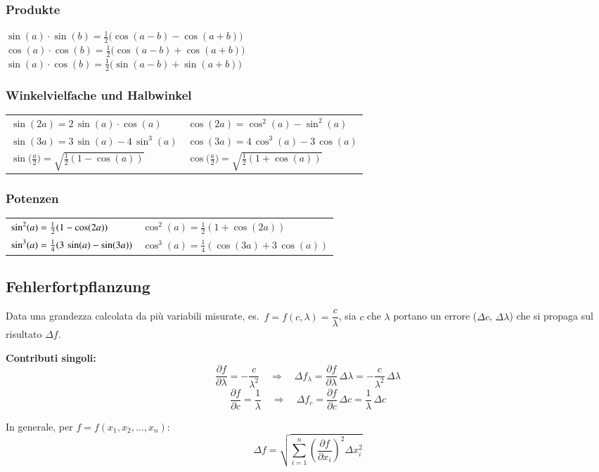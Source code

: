 \subsubsection{Produkte}

$\sin(a) \cdot \sin(b) = \frac{1}{2} \big( \cos(a-b) - \cos(a+b) \big) $ \\
$\cos(a) \cdot \cos(b) = \frac{1}{2} \big( \cos(a-b) + \cos(a+b) \big) $ \\	
$\sin(a) \cdot \cos(b) = \frac{1}{2} \big( \sin(a-b) + \sin(a+b) \big) $ 
    
    
\subsubsection{Winkelvielfache und Halbwinkel}

\renewcommand{\arraystretch}{1.3}
\begin{tabular}{ll}
    $\sin(2a) = 2 \, \sin(a) \cdot \cos(a)$                         & $\cos(2a) = \cos^2(a) - \sin^2(a)$                                \\
    $\sin(3a) = 3 \, \sin(a) -4 \, \sin^3(a)$                       & $\cos(3a) = 4 \, \cos^3(a) -3 \, \cos(a)$                         \\ 
    $\sin \big( \frac{a}{2} \big) = \sqrt{\frac{1}{2}(1-\cos(a))} $ & $\cos \big( \frac{a}{2} \big) = \sqrt{\frac{1}{2}(1+\cos(a))} $ 
\end{tabular}


\subsubsection{Potenzen}

\renewcommand{\arraystretch}{1.5}
\begin{tabular}{ll}
    $\sin^2(a) = \frac{1^{\mathstrut}}{2}(1-\cos(2a))$               & $\cos^2(a) = \frac{1}{2}(1+\cos(2a))$                \\
    $\sin^3(a) = \frac{1^{\mathstrut}}{4}(3\, \sin(a) - \sin(3a))$   & $\cos^3(a) = \frac{1}{4}(\cos(3a) + 3 \, \cos(a))$
\end{tabular}
\renewcommand{\arraystretch}{1}

\subsection{Fehlerfortpflanzung}

Data una grandezza calcolata da più variabili misurate, es.\ $f = f(c,\lambda) = \dfrac{c}{\lambda}$, sia $c$ che $\lambda$ portano un errore ($\Delta c$, $\Delta\lambda$) che si propaga sul risultato $\Delta f$.

\textbf{Contributi singoli:}
\[
\frac{\partial f}{\partial \lambda} = -\frac{c}{\lambda^2}
\quad\Rightarrow\quad
\Delta f_\lambda = \frac{\partial f}{\partial \lambda}\,\Delta\lambda = -\frac{c}{\lambda^2}\,\Delta\lambda
\]
\[
\frac{\partial f}{\partial c} = \frac{1}{\lambda}
\quad\Rightarrow\quad
\Delta f_c = \frac{\partial f}{\partial c}\,\Delta c = \frac{1}{\lambda}\,\Delta c
\]

In generale, per $f = f(x_1, x_2, \dots, x_n)$:
\[
\Delta f = \sqrt{\sum_{i=1}^n \left(\frac{\partial f}{\partial x_i}\right)^2 \Delta x_i^2}
\]